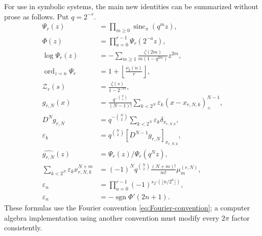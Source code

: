 \documentclass[11pt,oneside]{article}
\numberwithin{equation}{section}
\theoremstyle{definition}
\theoremstyle{remark}
\newcommand{\sincpi}{\operatorname{sinc}_{\pi}}
\newcommand{\sgn}{\operatorname{sgn}}
\newcommand{\ord}{\operatorname{ord}}
\newcommand{\eps}{\varepsilon}
\begin{document}
For use in symbolic systems, the main new identities can be summarized without
prose as follows.  Put $q=2^{-r}$.
\begin{align}
 \Psi_r(z)&=\prod_{m\ge0}\sincpi(q^mz),                    \label{eq:machine-1}\\
 \Phi(z)&=\prod_{a=0}^{r-1}\Psi_r(2^{-a}z),                \label{eq:machine-2}\\
 \log\Psi_r(z)&=-\sum_{m\ge1}\frac{\zeta(2m)}{m(1-q^{2m})}z^{2m}, \label{eq:machine-3}\\
 \ord_{z=n}\Psi_r&=1+\left\lfloor\frac{\nu_2(n)}r\right\rfloor, \label{eq:machine-4}\\
 \mathcal Z_r(s)&=\frac{\zeta(s)}{1-2^{-rs}},             \label{eq:machine-5}\\
 g_{r,N}(x)&=\frac{q^{-\binom N2}}{(N-1)!}
 \sum_{k<2^N}\eps_k(x-x_{r,N,k})_+^{N-1},                \label{eq:machine-6}\\
 D^Ng_{r,N}&=q^{-\binom N2}\sum_{k<2^N}\eps_k\delta_{x_{r,N,k}}, \label{eq:machine-7}\\
 \eps_k&=q^{\binom N2}[D^{N-1}g_{r,N}]_{x_{r,N,k}},       \label{eq:machine-8}\\
 \widehat{g_{r,N}}(z)&=\Psi_r(z)/\Psi_r(q^Nz),            \label{eq:machine-9}\\
 \sum_{k<2^N}\eps_kx_{r,N,k}^{N+m}
 &=(-1)^Nq^{\binom N2}\frac{(N+m)!}{m!}\mu_m^{(r,N)},    \label{eq:machine-10}\\
 \eps_n&=\prod_{a=0}^{r-1}(-1)^{s_{2^r}(\lfloor n/2^a\rfloor)}, \label{eq:machine-11}\\
 \eps_n&=-\sgn\Phi'(2n+1).                               \label{eq:machine-12}
\end{align}
These formulas use the Fourier convention \eqref{eq:Fourier-convention}; a
computer algebra implementation using another convention must modify every
$2\pi$ factor consistently.
\end{document}
